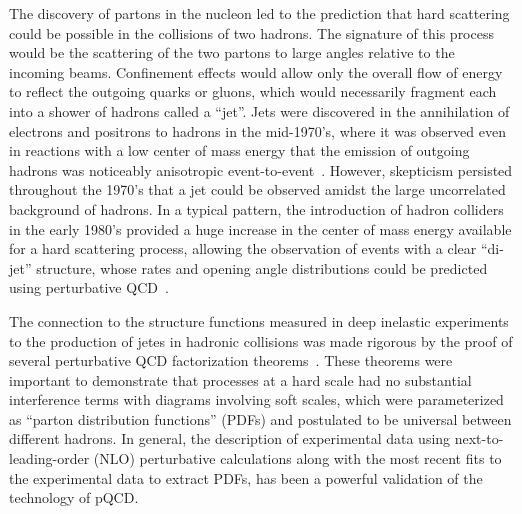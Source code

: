 The discovery of partons in the nucleon led to the prediction that hard scattering could
be possible in the collisions of two hadrons.  The signature of this process would be 
the scattering of the two partons to large angles relative to the incoming beams. 
Confinement effects would allow only the overall flow of energy to reflect the outgoing
quarks or gluons, which would necessarily fragment each into a shower of hadrons called
a ``jet''.  Jets were discovered in the annihilation of electrons and positrons to
hadrons in the mid-1970's, where it was observed even in reactions with a low center
of mass energy that the emission of outgoing hadrons was noticeably anisotropic event-to-event~\cite{Hanson:1975fe}.
However, skepticism persisted throughout the 1970's that a jet could be observed amidst the large
uncorrelated background of hadrons.
In a typical pattern, the introduction of hadron colliders in the early 1980's provided a
huge increase in the center of mass energy available for a hard scattering process,
allowing the observation of events with a clear ``di-jet'' structure, whose rates and
opening angle distributions could be predicted using perturbative QCD~\cite{Banner:1982kt}.

The connection to the structure functions measured in deep inelastic experiments to 
the production of jetes in hadronic collisions was made rigorous by the proof of several
perturbative QCD factorization theorems~\cite{Collins:1989gx}.
These theorems were important to demonstrate that processes at a hard scale had no
substantial interference terms with diagrams involving soft scales, which were 
parameterized as ``parton distribution functions'' (PDFs) and postulated to be
universal between different hadrons.
In general, the description of experimental data using next-to-leading-order (NLO) perturbative calculations
along with the most recent fits to the experimental data to extract PDFs, has been a powerful validation
of the technology of pQCD. %

